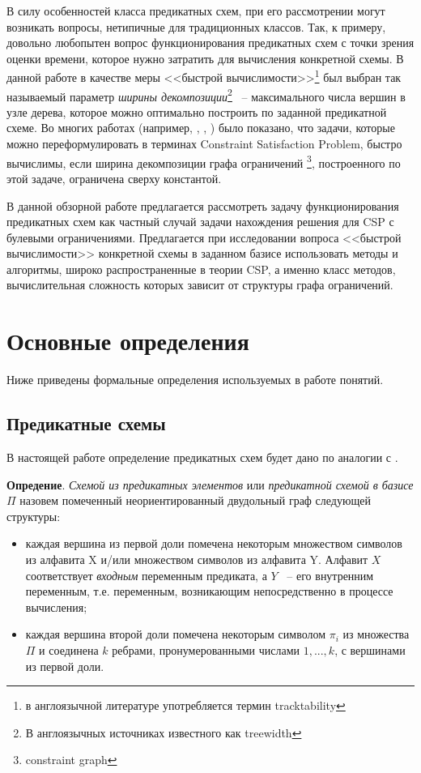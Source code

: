 \documentclass[12pt]{article}
\begin{document}
В силу особенностей класса предикатных схем, при его рассмотрении могут возникать вопросы,
нетипичные для традиционных классов. Так, к примеру, довольно любопытен вопрос функционирования предикатных схем с точки зрения оценки времени, которое нужно затратить для
вычисления конкретной схемы. 
В данной работе в качестве меры <<быстрой вычислимости>>\footnote{в англоязычной литературе употребляется термин tracktability}
 был выбран так называемый параметр \textit{ширины декомпозиции}\footnote{В англоязычных источниках известного как treewidth}
 ~-- максимального числа вершин в узле дерева, 
которое можно оптимально построить по заданной предикатной схеме. 
Во многих работах (например, \cite{CSP10}, \cite{Gott10}, \cite{Prosc89}) было 
показано, что задачи, которые можно переформулировать в терминах Constraint Satisfaction Problem, 
быстро вычислимы, если ширина декомпозиции графа ограничений \footnote{constraint graph}, построенного по этой задаче,
ограничена сверху константой. 

В данной обзорной работе предлагается рассмотреть задачу функционирования предикатных схем как
частный случай задачи нахождения решения для CSP с булевыми ограничениями. Предлагается при исследовании вопроса
<<быстрой вычислимости>> конкретной схемы в заданном базисе использовать методы и алгоритмы,
широко распространенные в теории CSP,
а именно класс методов, вычислительная сложность которых зависит от структуры графа ограничений.


\section{Основные определения}
Ниже приведены формальные определения используемых в работе понятий.

\subsection{Предикатные схемы}

В настоящей работе определение предикатных схем будет дано по аналогии с \cite{Shu11}.

\textbf{Опредение}.
\textit{Схемой из предикатных элементов} или \textit{предикатной схемой в базисе $\Pi$} назовем помеченный
неориентированный двудольный граф следующей структуры:

\begin{itemize}
\item каждая вершина из первой доли помечена некоторым множеством символов из алфавита X и/или 
множеством символов из алфавита Y. 
Алфавит $X$ соответствует \textit{входным} переменным предиката, а $Y$ ~-- его внутренним переменным, 
т.е. переменным, возникающим непосредственно в процессе вычисления; 

\item каждая вершина второй доли помечена некоторым символом $\pi_i$ из множества $\Pi$ и 
соединена $k$ ребрами, пронумерованными числами $1, ..., k$, с вершинами из первой доли.
\end{itemize}
\end{document}
